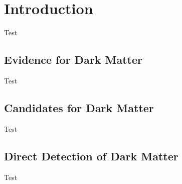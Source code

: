 \chapter{Introduction}\label{chap:intro}
Test
\section{Evidence for Dark Matter}
Test
\section{Candidates for Dark Matter}
Test
\section{Direct Detection of Dark Matter}
Test